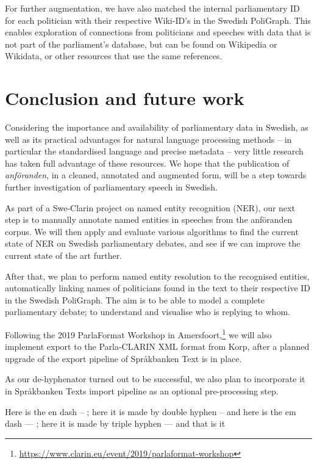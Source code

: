 For further augmentation, we have also matched the internal parliamentary ID for each politician with their respective Wiki-ID's in the Swedish PoliGraph. This enables exploration of connections from politicians and speeches with data that is not part of the parliament's database, but can be found on Wikipedia or Wikidata, or other resources that use the same references.


\section{Conclusion and future work}

Considering the importance and availability of parliamentary data in Swedish, as well as its practical advantages for natural language processing methods -- in particular the standardised language and precise metadata -- very little research has taken full advantage of these resources. We hope that the publication of \emph{anföranden}, in a cleaned, annotated and augmented form, will be a step towards further investigation of parliamentary speech in Swedish.

As part of a Swe-Clarin project on named entity recognition (NER), our next step is to manually annotate named entities in speeches from the anföranden corpus. We will then apply and evaluate various algorithms to find the current state of NER on Swedish parliamentary debates, and see if we can improve the current state of the art further.

After that, we plan to perform named entity resolution to the recognised entities, automatically linking names of politicians found in the text to their respective ID in the Swedish PoliGraph. The aim is to be able to model a complete parliamentary debate; to understand and visualise who is replying to whom.

Following the 2019 ParlaFormat Workshop in Amersfoort,\footnote{\url{https://www.clarin.eu/event/2019/parlaformat-workshop}} we will also implement export to the Parla-CLARIN XML format from Korp, after a planned upgrade of the export pipeline of Språkbanken Text is in place.

As our de-hyphenator turned out to be successful, we also plan to incorporate it in Språkbanken Texts import pipeline as an optional pre-processing step.

Here is the en dash – ; here it is made by double hyphen -- and
here is the em dash — ; here it is made by triple hyphen --- and 
that is it